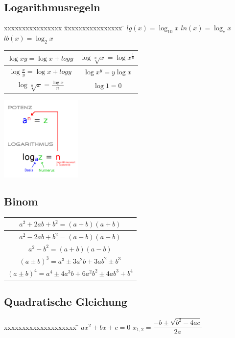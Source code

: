 \subsection{Logarithmusregeln}
\begin{minipage}{10cm}
	\begin{tabbing}
		xxxxxxxxxxxxxxxx \= xxxxxxxxxxxxxxxx \= \kill
		$lg(x) = \log_{10} x$ \> $ln(x) = \log_{e} x$ \> $lb(x) = \log_{2} x$
	\end{tabbing}
	\renewcommand{\arraystretch}{2}
	\begin{tabular}{|c|c|}
		\hline $\log{xy} = \log{x} + log{y}$ & $\log{\sqrt[n]{x}}=\log{x^\frac{1}{n}}$\\
		\hline $\log{\frac{x}{y}}= \log{x} + log{y}$ & $\log{x^y}= y\log{x}$ \\
		\hline $\log{\sqrt[n]{x}}= \frac{\log{x}}{n}$ & $\log{1}=0$\\
		\hline
	\end{tabular}
\end{minipage}
\begin{minipage}{5cm}
	\includegraphics[width=4cm]{images/potenz_logarithmus.png}	
\end{minipage}

\begin{multicols}{2}
	\subsection{Binom}
	\renewcommand{\arraystretch}{2}
	\begin{tabular}{|c|}
		\hline $a^2+2ab+b^2 = (a+b)(a+b)$\\
		\hline $a^2-2ab+b^2 = (a-b)(a-b)$\\
		\hline $a^2-b^2= (a+b)(a-b)$\\
		\hline $(a \pm b)^3 =a^3 \pm  3 a^{2} b + 3 a b^2 \pm b^3 $\\
		\hline $(a \pm b)^4 =a^4 \pm  4 a^{3} b + 6a^2b^2 \pm 4 a b^3 +	b^4$\\
		\hline
	\end{tabular}
	
	\subsection{Quadratische Gleichung}
	\begin{tabbing}
		xxxxxxxxxxxxxxxxxxxx \= \kill
		$ax^2+bx+c=0$ \> $x_{1,2} = \dfrac{-b \pm \sqrt{b^2 - 4ac}}{2a}$
	\end{tabbing}
\end{multicols}
\clearpage
\pagebreak
